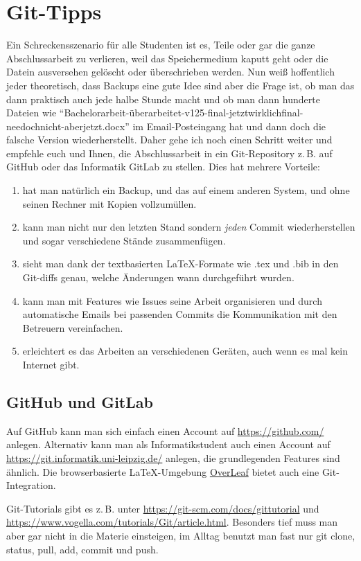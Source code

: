 \chapter{Git-Tipps}
Ein Schreckensszenario für alle Studenten ist es, Teile oder gar die ganze Abschlussarbeit zu verlieren, weil das Speichermedium kaputt geht oder die Datein ausversehen gelöscht oder überschrieben werden.
Nun weiß hoffentlich jeder theoretisch, dass Backups eine gute Idee sind aber die Frage ist, ob man das dann praktisch auch jede halbe Stunde macht und ob man dann hunderte Dateien wie \enquote{Bachelorarbeit-überarbeitet-v125-final-jetztwirklichfinal-needochnicht-aberjetzt.docx} im Email-Posteingang hat und dann doch die falsche Version wiederherstellt.
Daher gehe ich noch einen Schritt weiter und empfehle euch und Ihnen, die Abschlussarbeit in ein Git-Repository z.\,B. auf GitHub oder das Informatik GitLab zu stellen.
Dies hat mehrere Vorteile:

\begin{enumerate}
\item hat man natürlich ein Backup, und das auf einem anderen System, und ohne seinen Rechner mit Kopien vollzumüllen.
\item kann man nicht nur den letzten Stand sondern \emph{jeden} Commit wiederherstellen und sogar verschiedene Stände zusammenfügen.
\item sieht man dank der textbasierten LaTeX-Formate wie .tex und .bib in den Git-diffs genau, welche Änderungen wann durchgeführt wurden.
\item kann man mit Features wie Issues seine Arbeit organisieren und durch automatische Emails bei passenden Commits die Kommunikation mit den Betreuern vereinfachen.
\item erleichtert es das Arbeiten an verschiedenen Geräten, auch wenn es mal kein Internet gibt.
\end{enumerate}

\section{GitHub und GitLab}
Auf GitHub kann man sich einfach einen Account auf \url{https://github.com/} anlegen.
Alternativ kann man als Informatikstudent auch einen Account auf \url{https://git.informatik.uni-leipzig.de/} anlegen, die grundlegenden Features sind ähnlich.
Die browserbasierte LaTeX-Umgebung \href{https://www.overleaf.com/}{OverLeaf} bietet auch eine Git-Integration.

Git-Tutorials gibt es z.\,B. unter \url{https://git-scm.com/docs/gittutorial} und \url{https://www.vogella.com/tutorials/Git/article.html}.
Besonders tief muss man aber gar nicht in die Materie einsteigen, im Alltag benutzt man fast nur git clone, status, pull, add, commit und push.

